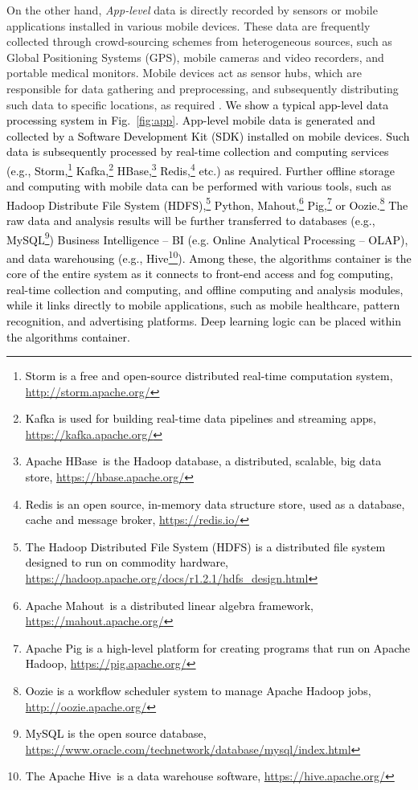 \documentclass[journal,comsoc,letter]{IEEEtran}
\newcommand{\rev}[1]{\textcolor{black}{#1}}
\begin{document}
On the other hand, \emph{App-level} data is directly recorded by sensors or mobile applications installed in various mobile devices. These data are frequently collected through crowd-sourcing schemes from heterogeneous sources, such as Global Positioning Systems (GPS), mobile cameras and video recorders, and portable medical monitors. Mobile devices act as sensor hubs, which are responsible for data gathering and preprocessing, and subsequently distributing such data to specific locations, as required \cite{cheng2017exploiting}.  \rev{We show a typical app-level data processing system in Fig.~\ref{fig:app}. App-level mobile data is generated and collected by a Software Development Kit (SDK) installed on mobile devices. Such data is subsequently processed by real-time collection and computing services (e.g., Storm,\footnote{\rev{Storm is a free and open-source distributed real-time computation system, \url{http://storm.apache.org/}}} Kafka,\footnote{\rev{Kafka\textsuperscript{\textregistered} is used for building real-time data pipelines and streaming apps, \url{https://kafka.apache.org/}}} HBase,\footnote{\rev{Apache HBase\texttrademark ~is the Hadoop database, a distributed, scalable, big data store, \url{https://hbase.apache.org/}}} Redis,\footnote{\rev{Redis is an open source, in-memory data structure store, used as a database, cache and message broker, \url{https://redis.io/}}} etc.) as required. Further offline storage and computing with mobile data can be performed with various tools, such as Hadoop Distribute File System (HDFS),\footnote{\rev{The Hadoop Distributed File System (HDFS) is a distributed file system designed to run on commodity hardware, \url{https://hadoop.apache.org/docs/r1.2.1/hdfs_design.html}}} Python, Mahout,\footnote{\rev{Apache Mahout\texttrademark ~is a distributed linear algebra framework, \url{https://mahout.apache.org/}}} Pig,\footnote{\rev{Apache Pig is a high-level platform for creating programs that run on Apache Hadoop, \url{https://pig.apache.org/}}} or Oozie.\footnote{\rev{Oozie is a workflow scheduler system to manage Apache Hadoop jobs, \url{http://oozie.apache.org/}}} The raw data and analysis results will be further transferred to databases (e.g., MySQL\footnote{\rev{MySQL is the open source database, \url{https://www.oracle.com/technetwork/database/mysql/index.html}}}) Business Intelligence -- BI (e.g. Online Analytical Processing -- OLAP), and data warehousing (e.g., Hive\footnote{\rev{The Apache Hive\texttrademark ~is a data warehouse software, \url{https://hive.apache.org/}}}). Among these, the algorithms container is the core of the entire system as it connects to front-end access and fog computing, real-time collection and computing, and offline computing and analysis modules, while it links directly to mobile applications, such as mobile healthcare, pattern recognition, and advertising platforms. Deep learning logic can be placed within the algorithms container.}
\end{document}
